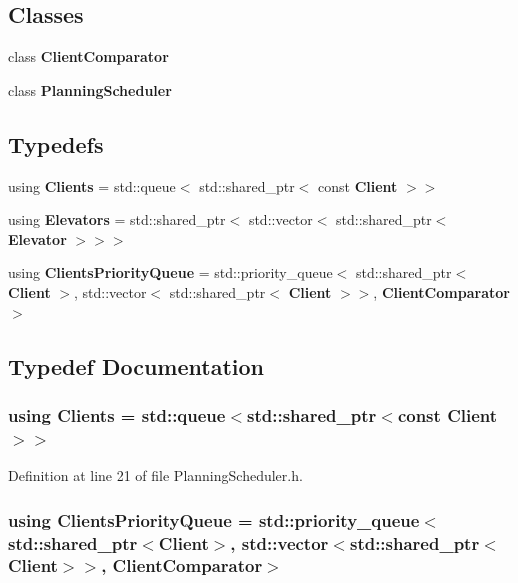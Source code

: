 \subsection*{Classes}
\begin{DoxyCompactItemize}
\item 
class {\bf Client\+Comparator}
\item 
class {\bf Planning\+Scheduler}
\end{DoxyCompactItemize}
\subsection*{Typedefs}
\begin{DoxyCompactItemize}
\item 
using {\bf Clients} = std\+::queue$<$ std\+::shared\+\_\+ptr$<$ const {\bf Client} $>$$>$
\item 
using {\bf Elevators} = std\+::shared\+\_\+ptr$<$ std\+::vector$<$ std\+::shared\+\_\+ptr$<$ {\bf Elevator} $>$$>$$>$
\item 
using {\bf Clients\+Priority\+Queue} = std\+::priority\+\_\+queue$<$ std\+::shared\+\_\+ptr$<$ {\bf Client} $>$, std\+::vector$<$ std\+::shared\+\_\+ptr$<$ {\bf Client} $>$$>$, {\bf Client\+Comparator} $>$
\end{DoxyCompactItemize}


\subsection{Typedef Documentation}
\subsubsection[{Clients}]{\setlength{\rightskip}{0pt plus 5cm}using {\bf Clients} =  std\+::queue$<$std\+::shared\+\_\+ptr$<$const {\bf Client}$>$$>$}\label{_planning_scheduler_8h_add488a8a1592b6f1d19e83a896e0840d}


Definition at line 21 of file Planning\+Scheduler.\+h.

\subsubsection[{Clients\+Priority\+Queue}]{\setlength{\rightskip}{0pt plus 5cm}using {\bf Clients\+Priority\+Queue} =  std\+::priority\+\_\+queue$<$std\+::shared\+\_\+ptr$<${\bf Client}$>$, std\+::vector$<$std\+::shared\+\_\+ptr$<${\bf Client}$>$$>$, {\bf Client\+Comparator}$>$}\label{_planning_scheduler_8h_a53fcb94a081789f7e78bb1c8840d9edd}


